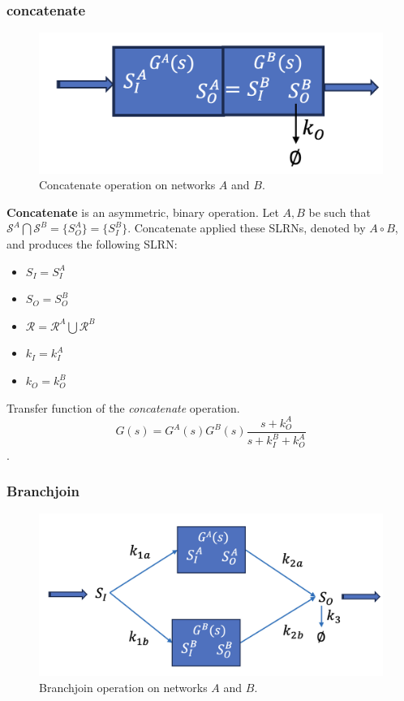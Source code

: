 \documentclass[unnumsec,webpdf,contemporary,large]{oup-authoring-template}%
\theoremstyle{thmstyleone}%
\theoremstyle{thmstyletwo}%
\theoremstyle{thmstylethree}%
\begin{document}
\subsubsection{concatenate}
\begin{figure}
         \centering
         \includegraphics[scale=0.3]{figures/concatenate.png}
          \caption[]{Concatenate operation on networks $A$ and $B$.}
         \label{fig:concatenate}
\end{figure}

{\bf Concatenate} is an asymmetric, binary operation.
Let $A, B$ be such that $\mathcal{S}^A \bigcap \mathcal{S}^B =
\{ S^A_O \} = \{ S^B_I \}$. 
Concatenate applied these SLRNs, denoted by $A \circ  B$,
and produces
the following SLRN:
\begin{itemize}
\item $S_I =S^A_I$
\item $S_O = S^B_O$
\item $\mathcal{R} = \mathcal{R}^A \bigcup \mathcal{R}^B$
\item $k_I = k^A_I$
\item $k_O = k^B_O$
\end{itemize}

Transfer function of the {\em concatenate} operation.
$$G(s) = G^A(s) G^B(s)\frac{s + k^A_O}{s+ k^B_I + k^A_O}$$.

\subsubsection{Branchjoin}
\begin{figure}
         \centering
         \includegraphics[scale=0.3]{figures/branchjoin.png}
          \caption[]{Branchjoin operation on networks $A$ and $B$.}
         \label{fig:branchjoin}
\end{figure}
\end{document}
